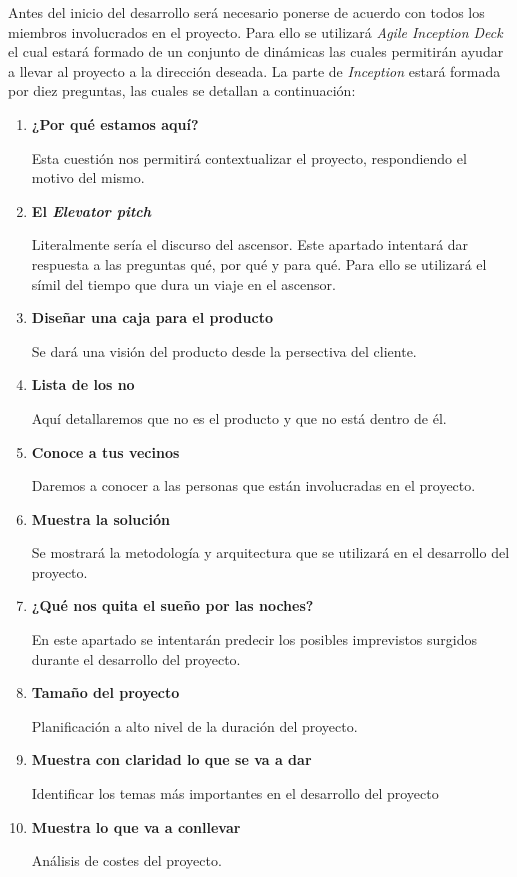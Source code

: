 Antes del inicio del desarrollo será necesario ponerse de acuerdo con todos los miembros involucrados en el proyecto.
Para ello se utilizará \textit{Agile Inception Deck} el cual estará formado de un conjunto de dinámicas las cuales permitirán
ayudar a llevar al proyecto a la dirección deseada. La parte de \textit{Inception} estará formada por diez preguntas, las
cuales se detallan a continuación:

\begin{enumerate}
  \item \textbf{¿Por qué estamos aquí?}

    Esta cuestión nos permitirá contextualizar el proyecto, respondiendo el motivo del mismo.
  \item \textbf{El \textit{Elevator pitch}}

    Literalmente sería el discurso del ascensor. Este apartado intentará dar respuesta a las preguntas qué, por qué y para qué.
    Para ello se utilizará el símil del tiempo que dura un viaje en el ascensor.
  \item \textbf{Diseñar una caja para el producto}

    Se dará una visión del producto desde la persectiva del cliente.
  \item \textbf{Lista de los no}

    Aquí detallaremos que no es el producto y que no está dentro de él.
  \item \textbf{Conoce a tus vecinos}

    Daremos a conocer a las personas que están involucradas en el proyecto.
  \item \textbf{Muestra la solución}

    Se mostrará la metodología y arquitectura que se utilizará en el desarrollo del proyecto.
  \item \textbf{¿Qué nos quita el sueño por las noches?}

    En este apartado se intentarán predecir los posibles imprevistos surgidos durante
    el desarrollo del proyecto.
  \item \textbf{Tamaño del proyecto}

    Planificación a alto nivel de la duración del proyecto.
  \item \textbf{Muestra con claridad lo que se va a dar}

    Identificar los temas más importantes en el desarrollo del proyecto
  \item \textbf{Muestra lo que va a conllevar}

    Análisis de costes del proyecto.
\end{enumerate}
